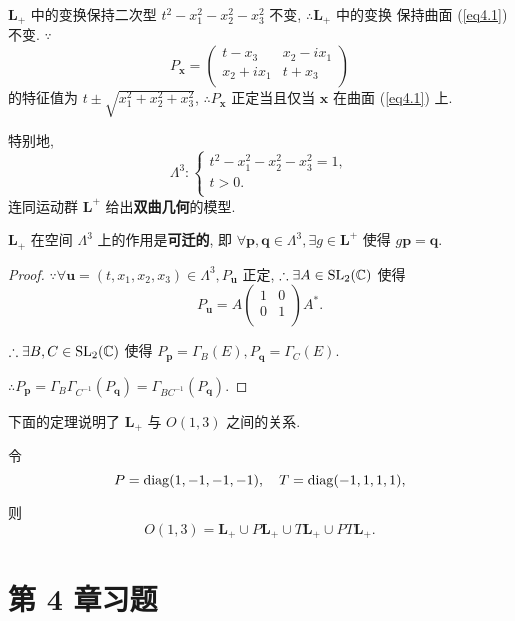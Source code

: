 \documentclass{ctexart}
\begin{document}
$\boldsymbol{L}_+$ 中的变换保持二次型 $t^2-x_1^2-x_2^2-x_3^2$ 不变, $\therefore\boldsymbol{L}_+$ 中的变换 保持曲面 (\ref{eq4.1}) 不变. $\because$
\[P_{\boldsymbol{x}}=\begin{pmatrix}
    t-x_3 & x_2-ix_1 \\
    x_2+ix_1 & t+x_3 \\
\end{pmatrix}\]
的特征值为 $t\pm\sqrt{x_1^2+x_2^2+x_3^2}$, $\therefore P_{\boldsymbol{x}}$ 正定当且仅当 $\boldsymbol{x}$ 在曲面 (\ref{eq4.1}) 上.

特别地, 
\[\Lambda^3:\begin{cases}
    t^2-x_1^2-x_2^2-x_3^2=1, \\
    t>0. \\
\end{cases}\]
连同运动群 $\boldsymbol{L}^+$ 给出\textbf{双曲几何}的模型.
\begin{theorem}
    $\boldsymbol{L}_+$ 在空间 $\Lambda^3$ 上的作用是\textbf{可迁的}, 即 $\forall\boldsymbol{p},\boldsymbol{q}\in\Lambda^3,\exists g\in\boldsymbol{L}^+$ 使得 $g\boldsymbol{p}=\boldsymbol{q}$.
\end{theorem}
\begin{proof}
    $\because\forall\boldsymbol{u}=(t,x_1,x_2,x_3)\in\Lambda^3,P_{\boldsymbol{u}}$ 正定, $\therefore\exists A\in\operatorname{SL} _2(\mathbb{C})$ 使得
    \[P_{\boldsymbol{u}}=A\begin{pmatrix}
        1 & 0 \\
        0 & 1 \\
    \end{pmatrix}A^*.\]

    $\therefore\exists B,C\in\operatorname{SL} _2(\mathbb{C})$ 使得 $P_{\boldsymbol{p}}=\Gamma_B(E),P_{\boldsymbol{q}}=\Gamma_C(E)$.

    $\therefore P_{\boldsymbol{p}}=\Gamma_B\Gamma_{C^{-1}}(P_{\boldsymbol{q}})=\Gamma_{BC^{-1}}(P_{\boldsymbol{q}})$.
\end{proof}
下面的定理说明了 $\boldsymbol{L}_+$ 与 $O(1,3)$ 之间的关系.
\begin{theorem}
    令
    \[P=\operatorname{diag} (1,-1,-1,-1),\quad T=\operatorname{diag} (-1,1,1,1),\]

    则
    \[O(1,3)=\boldsymbol{L}_+\cup P\boldsymbol{L}_+\cup T\boldsymbol{L}_+\cup PT\boldsymbol{L}_+.\]
\end{theorem}
\section{第 4 章习题}
\end{document}

